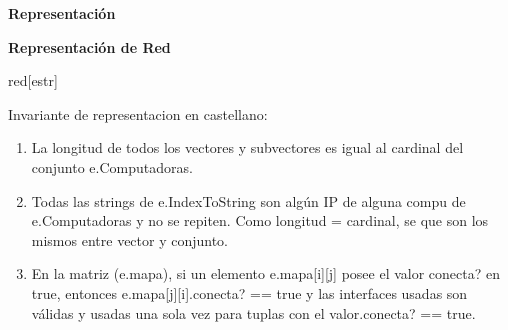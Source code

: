 \documentclass[a4paper,10pt]{article}
\newenvironment{Representacion}{%
  \vspace*{2ex}%
  \noindent\textbf{\Large Representación}%
  \vspace*{2ex}%
}{}
\begin{document}
\begin{Representacion}

\textbf{Representación de Red}

  \begin{Estructura}{red}[estr]

    \begin{Tupla}[estr]
    \end{Tupla}
    
  \end{Estructura}	
  
 
  
  Invariante de representacion en castellano:
  \begin{enumerate}
  
  \item La longitud de todos los vectores y subvectores es igual al cardinal del conjunto e.Computadoras.
  \item Todas las strings de e.IndexToString son algún IP de alguna compu de e.Computadoras y no se repiten. Como longitud = cardinal, se que son los mismos entre vector y conjunto.
  \item En la matriz (e.mapa), si un elemento e.mapa[i][j] posee el valor conecta? en true, entonces e.mapa[j][i].conecta? == true y las interfaces usadas son válidas y usadas una sola vez para tuplas con el valor.conecta? == true.
  
  \end{enumerate}
  
\end{Representacion}
\end{document}
